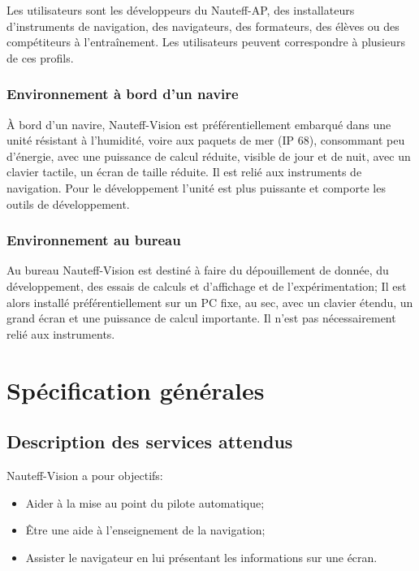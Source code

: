 \documentclass[a4paper,11pt]{report}
\begin{document}
Les utilisateurs sont les développeurs du Nauteff-AP, des installateurs
d'instruments de navigation, des navigateurs,
des formateurs, des élèves ou des compétiteurs à l'entraînement.
Les utilisateurs peuvent correspondre à plusieurs de ces profils.


\subsection{Environnement à bord d'un navire}

À bord d'un navire, Nauteff-Vision est préférentiellement embarqué
dans une unité résistant à l'humidité, voire
aux paquets de mer (IP 68),
consommant peu d'énergie,
avec une puissance de calcul réduite,
visible de jour et de nuit,
avec un clavier tactile,
un écran de taille réduite.
Il est relié aux instruments de navigation.
Pour le développement l'unité est plus puissante et comporte
les outils de développement. 

\subsection{Environnement au bureau}

Au bureau Nauteff-Vision est destiné à faire du dépouillement de donnée,
du développement, des essais de calculs et d'affichage et de l'expérimentation;
Il est alors installé préférentiellement sur un PC fixe,
au sec, avec un clavier étendu, un grand écran et
une puissance de calcul importante.
Il n'est pas nécessairement relié aux instruments.

\chapter{Spécification générales}
\section{Description des services attendus}

Nauteff-Vision a pour objectifs:
\begin{itemize}
	\item Aider à la mise au point du pilote automatique;
	\item Être une aide à l'enseignement de la navigation;
	\item Assister le navigateur en lui présentant les informations
	sur une écran.
	
\end{itemize}
\end{document}
